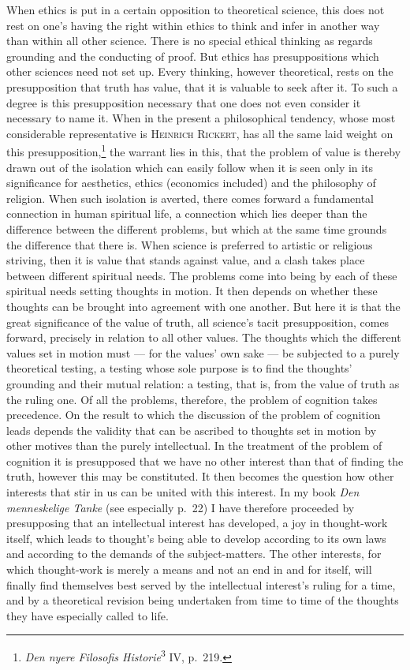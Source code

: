 \documentclass[12pt]{book}
\newcommand{\opage}[1]{\marginnote{\footnotesize\textit{[#1]}}}
\begin{document}
When ethics is put in a certain opposition to theoretical science, this does not
rest on one's having the right within ethics to think and infer in another way
than within all other science. There is no special ethical thinking as regards
grounding and the conducting of proof. But ethics has presuppositions which other
sciences need not set up. Every thinking, however theoretical, rests on the
presupposition that truth has value, that it is valuable to seek after it. To such
a degree is this presupposition necessary that one does not even consider it
necessary to name it. When in the present a philosophical tendency, whose most
considerable representative is \textsc{Heinrich Rickert}, has all the same laid
weight on this presupposition,\footnote{\textit{Den nyere Filosofis
Historie}\textsuperscript{3} IV, p.\ 219.} the warrant lies in this, that the
problem of value is thereby drawn out of the isolation which can easily follow
when it is seen only in its significance for aesthetics, ethics (economics
included) and the philosophy of religion. When such isolation is averted, there
comes forward a fundamental connection in human spiritual \opage{120}life, a connection which
lies deeper than the difference between the different problems, but which at the
same time grounds the difference that there is. When science is preferred to
artistic or religious striving, then it is value that stands against value, and a
clash takes place between different spiritual needs. The problems come into being
by each of these spiritual needs setting thoughts in motion. It then depends on
whether these thoughts can be brought into agreement with one another. But here it
is that the great significance of the value of truth, all science's tacit
presupposition, comes forward, precisely in relation to all other values. The
thoughts which the different values set in motion must --- for the values' own
sake --- be subjected to a purely theoretical testing, a testing whose sole purpose
is to find the thoughts' grounding and their mutual relation: a testing, that is,
from the value of truth as the ruling one. Of all the problems, therefore, the
problem of cognition takes precedence. On the result to which the discussion of
the problem of cognition leads depends the validity that can be ascribed to
thoughts set in motion by other motives than the purely intellectual. In the
treatment of the problem of cognition it is presupposed that we have no other
interest than that of finding the truth, however this may be constituted. It then
becomes the question how other interests that stir in us can be united with this
interest. In my book \textit{Den menneskelige Tanke} (see especially p.\ 22) I
have therefore proceeded by presupposing that an intellectual interest has
developed, a joy in thought-work itself, which leads to thought's being able to
develop according to its own laws and according to the demands of the
subject-matters. The other interests, for which thought-work is merely a means and
not an end in and for itself, will finally \opage{121}find themselves best served by the
intellectual interest's ruling for a time, and by a theoretical revision being
undertaken from time to time of the thoughts they have especially called to life.
\end{document}
